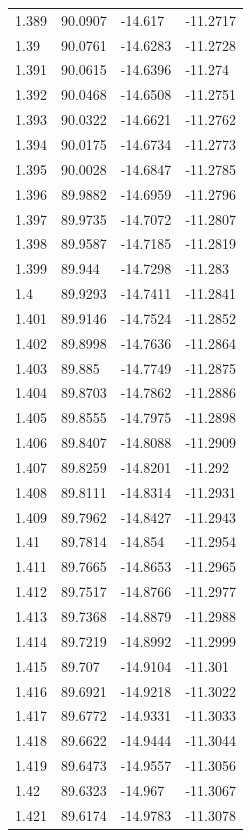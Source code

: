 \begin{tabular}{llll}
1.389 & 90.0907 & -14.617 & -11.2717 \\
1.39 & 90.0761 & -14.6283 & -11.2728 \\
1.391 & 90.0615 & -14.6396 & -11.274 \\
1.392 & 90.0468 & -14.6508 & -11.2751 \\
1.393 & 90.0322 & -14.6621 & -11.2762 \\
1.394 & 90.0175 & -14.6734 & -11.2773 \\
1.395 & 90.0028 & -14.6847 & -11.2785 \\
1.396 & 89.9882 & -14.6959 & -11.2796 \\
1.397 & 89.9735 & -14.7072 & -11.2807 \\
1.398 & 89.9587 & -14.7185 & -11.2819 \\
1.399 & 89.944 & -14.7298 & -11.283 \\
1.4 & 89.9293 & -14.7411 & -11.2841 \\
1.401 & 89.9146 & -14.7524 & -11.2852 \\
1.402 & 89.8998 & -14.7636 & -11.2864 \\
1.403 & 89.885 & -14.7749 & -11.2875 \\
1.404 & 89.8703 & -14.7862 & -11.2886 \\
1.405 & 89.8555 & -14.7975 & -11.2898 \\
1.406 & 89.8407 & -14.8088 & -11.2909 \\
1.407 & 89.8259 & -14.8201 & -11.292 \\
1.408 & 89.8111 & -14.8314 & -11.2931 \\
1.409 & 89.7962 & -14.8427 & -11.2943 \\
1.41 & 89.7814 & -14.854 & -11.2954 \\
1.411 & 89.7665 & -14.8653 & -11.2965 \\
1.412 & 89.7517 & -14.8766 & -11.2977 \\
1.413 & 89.7368 & -14.8879 & -11.2988 \\
1.414 & 89.7219 & -14.8992 & -11.2999 \\
1.415 & 89.707 & -14.9104 & -11.301 \\
1.416 & 89.6921 & -14.9218 & -11.3022 \\
1.417 & 89.6772 & -14.9331 & -11.3033 \\
1.418 & 89.6622 & -14.9444 & -11.3044 \\
1.419 & 89.6473 & -14.9557 & -11.3056 \\
1.42 & 89.6323 & -14.967 & -11.3067 \\
1.421 & 89.6174 & -14.9783 & -11.3078 \\

\end{tabular}
